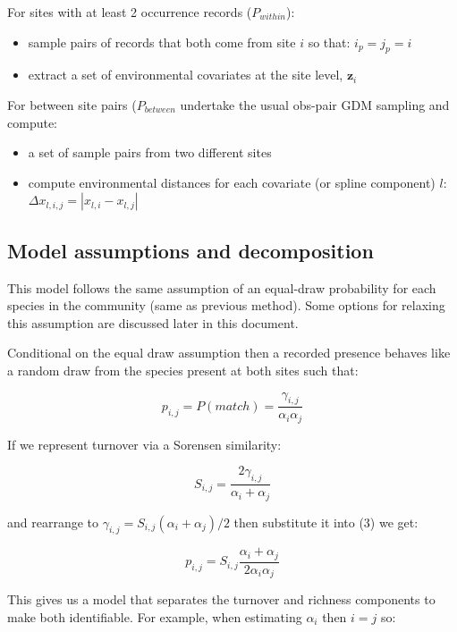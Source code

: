 \documentclass{article}
\begin{document}
For sites with at least 2 occurrence records ($P_{within}$):
\begin{itemize}
    \item sample pairs of records that both come from site $i$ so that:
$i_{p} = j_{p} = i$
    \item extract a set of environmental covariates at the site level, $\textbf{z}_{i}$
\end{itemize}

For between site pairs ($P_{between}$ undertake the usual obs-pair GDM sampling and compute:
\begin{itemize}
    \item a set of sample pairs from two different sites
    \item compute environmental distances for each covariate (or spline component) $l$: $\Delta x_{l,i,j} = |x_{l,i} - x_{l,j}|$
\end{itemize}

\subsection{Model assumptions and decomposition}

This model follows the same assumption of an equal-draw probability for each species in the community (same as previous method). Some options for relaxing this assumption are discussed later in this document.

Conditional on the equal draw assumption then a recorded presence behaves like a random draw from the species present at both sites such that:

\begin{equation}
    p_{i,j} = P(match) = \frac{
    \gamma_{i,j}
    }{
    \alpha_{i}\alpha_{j}
    }
\end{equation}

If we represent turnover via a Sorensen similarity:

\begin{equation}
    S_{i,j} = \frac{2\gamma_{i,j}}{\alpha_{i} + \alpha_{j}}
\end{equation}

and rearrange to $\gamma_{i,j} = S_{i,j}(\alpha_{i} + \alpha_{j})/2$ then substitute it into (3) we get:

\begin{equation}
    p_{i,j} = S_{i,j} \frac{\alpha_{i} + \alpha_j}{2\alpha_{i}\alpha_{j}}
\end{equation}

This gives us a model that separates the turnover and richness components to make both identifiable. For example, when estimating $\alpha_{i}$ then $i = j$ so:
\end{document}
